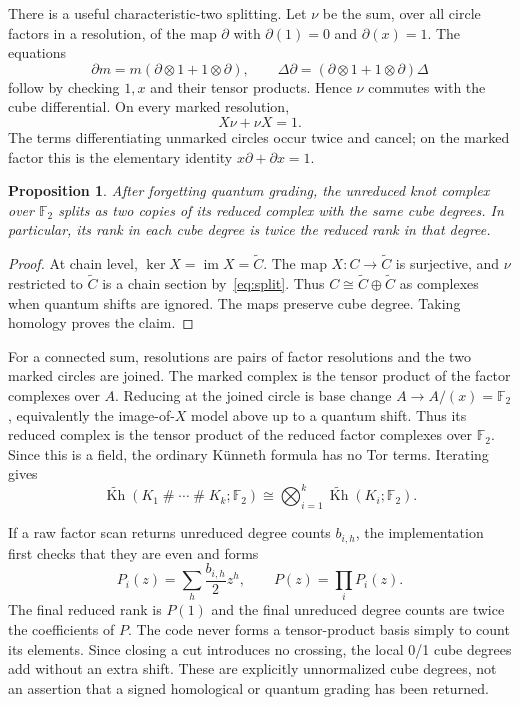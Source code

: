 \documentclass[11pt,letterpaper]{article}
\newtheorem{proposition}[theorem]{Proposition}
\theoremstyle{definition}
\newcommand{\F}{\mathbb F_2}
\newcommand{\rKh}{\widetilde{\operatorname{Kh}}}
\begin{document}
There is a useful characteristic-two splitting. Let $\nu$ be the sum, over all
circle factors in a resolution, of the map $\partial$ with
$\partial(1)=0$ and $\partial(x)=1$. The equations
\[
 \partial m=m(\partial\otimes1+1\otimes\partial),\qquad
 \Delta\partial=(\partial\otimes1+1\otimes\partial)\Delta
\]
follow by checking $1,x$ and their tensor products. Hence $\nu$ commutes with the
cube differential. On every marked resolution,
\begin{equation}\label{eq:split}
 X\nu+\nu X=1.
\end{equation}
The terms differentiating unmarked circles occur twice and cancel; on the marked
factor this is the elementary identity $x\partial+\partial x=1$.

\begin{proposition}\label{prop:twocopies}
After forgetting quantum grading, the unreduced knot complex over $\F$ splits
as two copies of its reduced complex with the same cube degrees. In particular,
its rank in each cube degree is twice the reduced rank in that degree.
\end{proposition}
\begin{proof}
At chain level, $\ker X=\operatorname{im}X=\widetilde C$. The map
$X:C\to\widetilde C$ is surjective, and $\nu$ restricted to $\widetilde C$ is a
chain section by~\eqref{eq:split}. Thus
$C\cong\widetilde C\oplus\widetilde C$ as complexes when quantum shifts are
ignored. The maps preserve cube degree. Taking homology proves the claim.
\end{proof}

For a connected sum, resolutions are pairs of factor resolutions and the two
marked circles are joined. The marked complex is the tensor product of the
factor complexes over $A$. Reducing at the joined circle is base change
$A\to A/(x)=\F$, equivalently the image-of-$X$ model above up to a quantum shift.
Thus its reduced complex is the tensor product of the reduced factor complexes
over $\F$. Since this is a field, the ordinary K\"unneth formula has no Tor
terms. Iterating gives
\begin{equation}\label{eq:kunneth}
 \rKh(K_1\mathbin{\#}\cdots\mathbin{\#}K_k;\F)
 \cong\bigotimes_{i=1}^k\rKh(K_i;\F).
\end{equation}

If a raw factor scan returns unreduced degree counts $b_{i,h}$, the implementation
first checks that they are even and forms
\begin{equation}\label{eq:convolution}
 P_i(z)=\sum_h\frac{b_{i,h}}2z^h,
 \qquad
 P(z)=\prod_i P_i(z).
\end{equation}
The final reduced rank is $P(1)$ and the final unreduced degree counts are twice
the coefficients of $P$. The code never forms a tensor-product basis simply to
count its elements. Since closing a cut introduces no crossing, the local
0/1 cube degrees add without an extra shift. These are explicitly unnormalized
cube degrees, not an assertion that a signed homological or quantum grading has
been returned.
\end{document}
